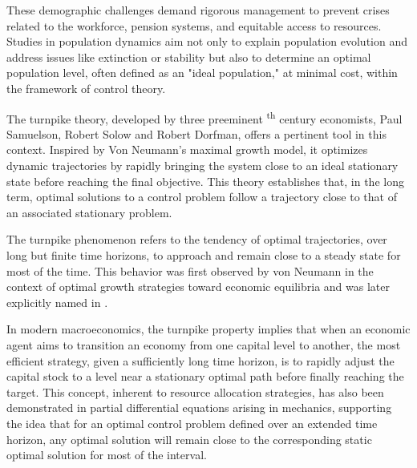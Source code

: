 \documentclass[10pt, a4]{amsart}
\theoremstyle{plain}
\theoremstyle{definition}
\theoremstyle{remark}
\numberwithin{equation}{section}
\begin{document}
These demographic challenges demand rigorous management to prevent crises related to the workforce, pension systems, and equitable access to resources. Studies in population dynamics aim not only to explain population evolution and address issues like extinction or stability but also to determine an optimal population level, often defined as an "ideal population," at minimal cost, within the framework of control theory.

The turnpike theory, developed by three preeminent \textsc{}\textsuperscript{th} century economists, Paul Samuelson, Robert Solow and Robert Dorfman, offers a pertinent tool in this context. Inspired by Von Neumann's maximal growth model, it optimizes dynamic trajectories by rapidly bringing the system close to an ideal stationary state before reaching the final objective. This theory establishes that, in the long term, optimal solutions to a control problem follow a trajectory close to that of an associated stationary problem.


The turnpike phenomenon refers to the tendency of optimal trajectories, over long but finite time horizons, to approach and remain close to a steady state for most of the time. This behavior was first observed by von Neumann in the context of optimal growth strategies toward economic equilibria and was later explicitly named in \cite{ref11}.

In modern macroeconomics, the turnpike property implies that when an economic agent aims to transition an economy from one capital level to another, the most efficient strategy, given a sufficiently long time horizon, is to rapidly adjust the capital stock to a level near a stationary optimal path before finally reaching the target. This concept, inherent to resource allocation strategies, has also been demonstrated in partial differential equations arising in mechanics, supporting the idea that for an optimal control problem defined over an extended time horizon, any optimal solution will remain close to the corresponding static optimal solution for most of the interval.
\end{document}
